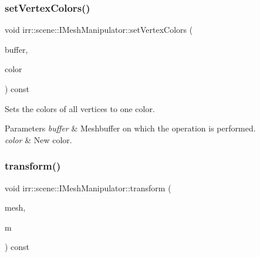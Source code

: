 \subsubsection{\texorpdfstring{set\+Vertex\+Colors()}{setVertexColors()}\hspace{0.1cm}{\footnotesize\ttfamily [2/2]}}
{\footnotesize\ttfamily void irr\+::scene\+::\+I\+Mesh\+Manipulator\+::set\+Vertex\+Colors (\begin{DoxyParamCaption}\item[{\hyperlink{classirr_1_1scene_1_1IMeshBuffer}{I\+Mesh\+Buffer} $\ast$}]{buffer,  }\item[{\hyperlink{classirr_1_1video_1_1SColor}{video\+::\+S\+Color}}]{color }\end{DoxyParamCaption}) const\hspace{0.3cm}{\ttfamily [inline]}}



Sets the colors of all vertices to one color. 


\begin{DoxyParams}{Parameters}
{\em buffer} & Meshbuffer on which the operation is performed. \\
\hline
{\em color} & New color. \\
\hline
\end{DoxyParams}
\mbox{\label{classirr_1_1scene_1_1IMeshManipulator_a9f9962d31cbd4ebeb1be0812765884cf}} 
\subsubsection{\texorpdfstring{transform()}{transform()}\hspace{0.1cm}{\footnotesize\ttfamily [1/2]}}
{\footnotesize\ttfamily void irr\+::scene\+::\+I\+Mesh\+Manipulator\+::transform (\begin{DoxyParamCaption}\item[{\hyperlink{classirr_1_1scene_1_1IMesh}{I\+Mesh} $\ast$}]{mesh,  }\item[{const \hyperlink{namespaceirr_1_1core_a73fa92e638c5ca97efd72da307cc9b65}{core\+::matrix4} \&}]{m }\end{DoxyParamCaption}) const\hspace{0.3cm}{\ttfamily [inline]}}



